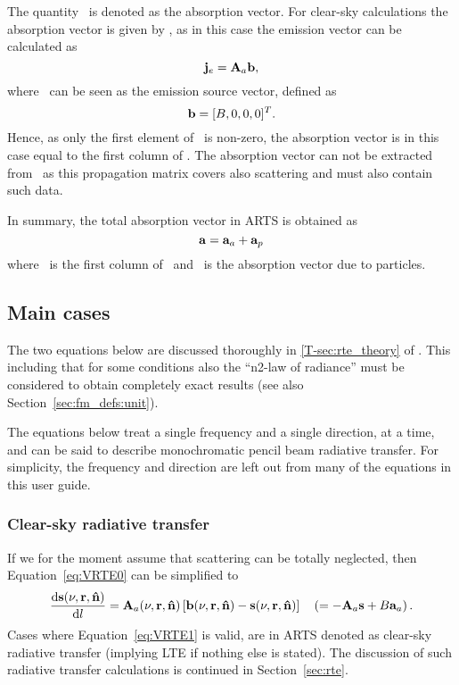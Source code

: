 The quantity \AbsVec\ is denoted as the absorption vector. For clear-sky
calculations the absorption vector is given by , as in this case the
emission vector can be calculated as
\begin{equation}
  \label{eq:evec2}
  {\bf j}_{e} = {\bf A}_{a}{\bf b},
\end{equation}
where \EmsVec\ can be seen as the emission source vector, defined as
\begin{equation}
  {\bf b} = [B,0,0,0]^T.
\end{equation}
Hence, as only the first element of \EmsVec\ is non-zero, the absorption
vector is in this case equal to the first column of .
The absorption vector can not be extracted from \ as this
propagation matrix covers also scattering and 
must also contain such data.

In summary, the total absorption vector in ARTS is obtained as
\begin{equation}
  \label{eq:evec3}
  {\bf a} = {\bf a}_{a} + {\bf a}_{p}
\end{equation}
where \ is the first column of \, and \ is the
absorption vector due to particles.




\subsection{Main cases}
\label{sec:rteq:cases}
%
The two equations below are discussed thoroughly in \ref{T-sec:rte_theory} of
\theory. This including that for some conditions also the ``n2-law of
radiance'' must be considered to obtain completely exact results (see also
Section~\ref{sec:fm_defs:unit}).

The equations below treat a single frequency and a single direction,
at a time, and can be said to describe monochromatic pencil beam radiative
transfer. For simplicity, the frequency and direction are left out from many of
the equations in this user guide.

\subsubsection{Clear-sky radiative transfer}
%
If we for the moment assume that scattering can be totally neglected, then
Equation~\ref{eq:VRTE0} can be simplified to
\begin{equation}
  \label{eq:VRTE1}
  \frac{\mathrm{d}{\bf s}(\nu,{\bf r},{\bf \hat{n}})}{\mathrm{d} l} =
  {\bf A}_{a}(\nu,{\bf r},{\bf \hat{n}})\left[ {\bf b}(\nu,{\bf r},{\bf \hat{n}})- 
  {\bf s}(\nu,{\bf r},{\bf \hat{n}})\right] \quad 
  \left( = -{\bf A}_{a}{\bf s} + B{\bf a}_{a}\right).
\end{equation}
Cases where Equation~\ref{eq:VRTE1} is valid, are in ARTS denoted as clear-sky
radiative transfer (implying LTE if nothing else is stated). The discussion of
such radiative transfer calculations is continued in Section~\ref{sec:rte}.


